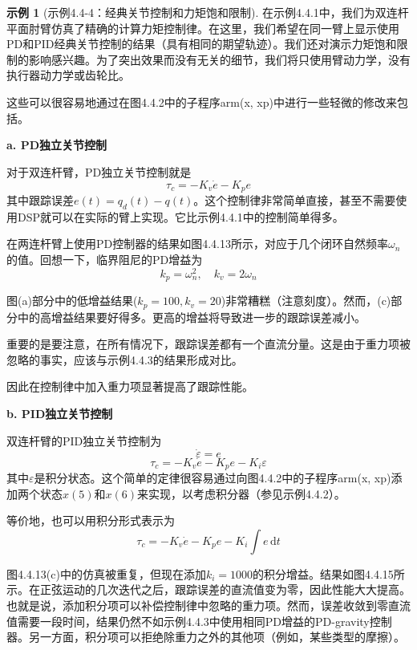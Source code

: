 \documentclass[UTF8]{ctexart}
\theoremstyle{definition}
\newtheorem{example}{示例}[section]
\newcommand{\dd}{\mathrm{d}}
\begin{document}
\begin{example}[示例4.4-4：经典关节控制和力矩饱和限制]
在示例4.4.1中，我们为双连杆平面肘臂仿真了精确的计算力矩控制律。在这里，我们希望在同一臂上显示使用PD和PID经典关节控制的结果（具有相同的期望轨迹）。我们还对演示力矩饱和限制的影响感兴趣。为了突出效果而没有无关的细节，我们将只使用臂动力学，没有执行器动力学或齿轮比。

这些可以很容易地通过在图4.4.2中的子程序arm(x, xp)中进行一些轻微的修改来包括。

\textbf{a. PD独立关节控制}

对于双连杆臂，PD独立关节控制就是
\begin{equation*}
    \tau_c = -K_v\dot{e} - K_pe
\end{equation*}
其中跟踪误差$e(t) = q_d(t) - q(t)$。这个控制律非常简单直接，甚至不需要使用DSP就可以在实际的臂上实现。它比示例4.4.1中的控制简单得多。

在两连杆臂上使用PD控制器的结果如图4.4.13所示，对应于几个闭环自然频率$\omega_n$的值。回想一下，临界阻尼的PD增益为
\begin{equation*}
    k_p = \omega_n^2, \quad k_v = 2\omega_n
\end{equation*}

图(a)部分中的低增益结果($k_p = 100, k_v = 20$)非常糟糕（注意刻度）。然而，(c)部分中的高增益结果要好得多。更高的增益将导致进一步的跟踪误差减小。

重要的是要注意，在所有情况下，跟踪误差都有一个直流分量。这是由于重力项被忽略的事实，应该与示例4.4.3的结果形成对比。

因此在控制律中加入重力项显著提高了跟踪性能。

\textbf{b. PID独立关节控制}

双连杆臂的PID独立关节控制为
\begin{equation*}
    \dot{\varepsilon} = e
\end{equation*}
\begin{equation*}
    \tau_c = -K_v\dot{e} - K_pe - K_i\varepsilon
\end{equation*}
其中$\varepsilon$是积分状态。这个简单的定律很容易通过向图4.4.2中的子程序arm(x, xp)添加两个状态$x(5)$和$x(6)$来实现，以考虑积分器（参见示例4.4.2）。

等价地，也可以用积分形式表示为
\begin{equation*}
    \tau_c = -K_v\dot{e} - K_pe - K_i\int e\,\dd t
\end{equation*}

图4.4.13(c)中的仿真被重复，但现在添加$k_i = 1000$的积分增益。结果如图4.4.15所示。在正弦运动的几次迭代之后，跟踪误差的直流值变为零，因此性能大大提高。也就是说，添加积分项可以补偿控制律中忽略的重力项。然而，误差收敛到零直流值需要一段时间，结果仍然不如示例4.4.3中使用相同PD增益的PD-gravity控制器。另一方面，积分项可以拒绝除重力之外的其他项（例如，某些类型的摩擦）。


\end{example}
\end{document}

